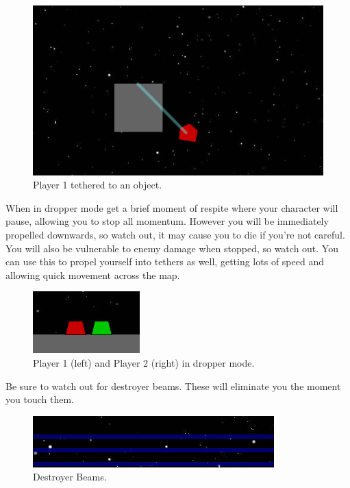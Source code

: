 \documentclass[10pt,a4paper]{article}
\begin{document}
\begin{figure}[!h]
\centering
  \includegraphics[scale = 0.5]{player_1_tethered.png}
  \caption{Player 1 tethered to an object.}
  \label{fig:boat1}
\end{figure}

When in dropper mode get a brief moment of respite where your character will pause, allowing you to stop all momentum. However you will be immediately propelled downwards, so watch out, it may cause you to die if you're not careful. You will also be vulnerable to enemy damage when stopped, so watch out. You can use this to propel yourself into tethers as well, getting lots of speed and allowing quick movement across the map.

\begin{figure}[!h]
\centering
  \includegraphics{dropper_mode.png}
  \caption{Player 1 (left) and Player 2 (right) in dropper mode.}
  \label{fig:boat1}
\end{figure}

Be sure to watch out for destroyer beams. These will eliminate you the moment you touch them.

\begin{figure}[!h]
\centering
  \includegraphics{destroyer_beams.png}
  \caption{Destroyer Beams.}
  \label{fig:boat1}
\end{figure}
\end{document}
